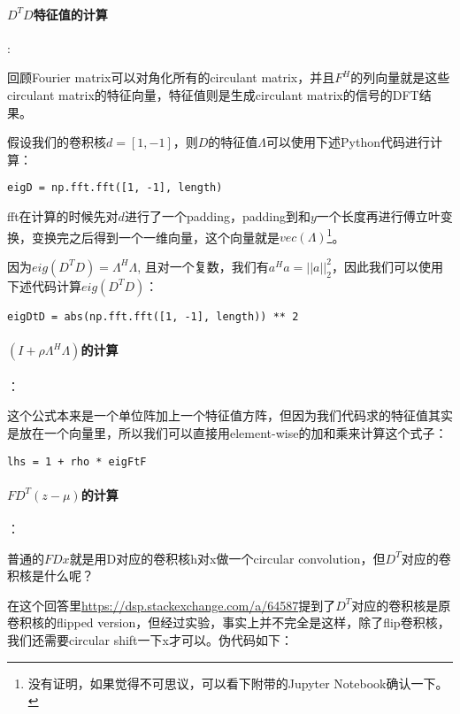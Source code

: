 \documentclass[10pt]{report}
\begin{document}
\paragraph{$D^TD$特征值的计算}:

回顾Fourier matrix可以对角化所有的circulant matrix，并且$F^H$的列向量就是这些circulant matrix的特征向量，特征值则是生成circulant matrix的信号的DFT结果。

假设我们的卷积核$d=[1,-1]$，则$D$的特征值$\Lambda$可以使用下述Python代码进行计算：

\begin{verbatim}
eigD = np.fft.fft([1, -1], length)
\end{verbatim}

fft在计算的时候先对$d$进行了一个padding，padding到和$y$一个长度再进行傅立叶变换，变换完之后得到一个一维向量，这个向量就是$vec(\Lambda)$\footnote{没有证明，如果觉得不可思议，可以看下附带的Jupyter Notebook确认一下。}。

因为$eig(D^TD)=\Lambda^H\Lambda$, 且对一个复数，我们有$a^Ha = ||a||_2^2$，因此我们可以使用下述代码计算$eig(D^TD)$：

\begin{verbatim}
eigDtD = abs(np.fft.fft([1, -1], length)) ** 2
\end{verbatim}

\paragraph{$\left( I +\rho \Lambda^H\Lambda \right)$的计算}：

这个公式本来是一个单位阵加上一个特征值方阵，但因为我们代码求的特征值其实是放在一个向量里，所以我们可以直接用element-wise的加和乘来计算这个式子：

\begin{verbatim}
lhs = 1 + rho * eigFtF
\end{verbatim}

\paragraph{$FD^T(z-\mu)$的计算}：

普通的$FDx$就是用D对应的卷积核h对x做一个circular convolution，但$D^T$对应的卷积核是什么呢？

在这个回答里\url{https://dsp.stackexchange.com/a/64587}提到了$D^T$对应的卷积核是原卷积核的flipped version，但经过实验，事实上并不完全是这样，除了flip卷积核，我们还需要circular shift一下x才可以。伪代码如下：
\end{document}
